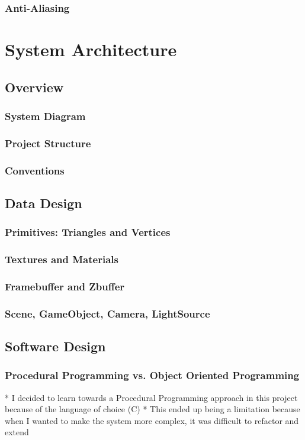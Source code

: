 \documentclass{article}
\begin{document}
\subsubsection{Anti-Aliasing}

\section{System Architecture}

\subsection{Overview}
\subsubsection{System Diagram}
\subsubsection{Project Structure}
\subsubsection{Conventions}

\subsection{Data Design}
\subsubsection{Primitives: Triangles and Vertices}
\subsubsection{Textures and Materials}
\subsubsection{Framebuffer and Zbuffer}
\subsubsection{Scene, GameObject, Camera, LightSource}

\subsection{Software Design}
\subsubsection{Procedural Programming vs. Object Oriented Programming}
* I decided to learn towards a Procedural Programming approach in this project because of the language of choice (C)
* This ended up being a limitation because when I wanted to make the system more complex, it was difficult to refactor and extend
\end{document}

